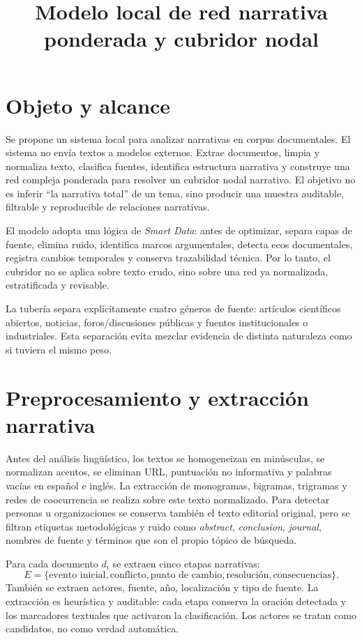 \documentclass[11pt]{article}
\title{Modelo local de red narrativa ponderada y cubridor nodal}
\author{}
\date{}
\begin{document}
\maketitle

\section{Objeto y alcance}

Se propone un sistema local para analizar narrativas en corpus documentales.
El sistema no envía textos a modelos externos. Extrae documentos, limpia y
normaliza texto, clasifica fuentes, identifica estructura narrativa y construye
una red compleja ponderada para resolver un cubridor nodal narrativo. El objetivo
no es inferir ``la narrativa total'' de un tema, sino producir una muestra
auditable, filtrable y reproducible de relaciones narrativas.

El modelo adopta una lógica de \textit{Smart Data}: antes de optimizar, separa
capas de fuente, elimina ruido, identifica marcos argumentales, detecta ecos
documentales, registra cambios temporales y conserva trazabilidad técnica. Por
lo tanto, el cubridor no se aplica sobre texto crudo, sino sobre una red ya
normalizada, estratificada y revisable.

La tubería separa explícitamente cuatro géneros de fuente: artículos
científicos abiertos, noticias, foros/discusiones públicas y fuentes
institucionales o industriales. Esta separación evita mezclar evidencia de
distinta naturaleza como si tuviera el mismo peso.

\section{Preprocesamiento y extracción narrativa}

Antes del análisis lingüístico, los textos se homogeneizan en minúsculas, se
normalizan acentos, se eliminan URL, puntuación no informativa y palabras vacías
en español e inglés. La extracción de monogramas, bigramas, trigramas y redes de
coocurrencia se realiza sobre este texto normalizado. Para detectar personas u
organizaciones se conserva también el texto editorial original, pero se filtran
etiquetas metodológicas y ruido como \textit{abstract}, \textit{conclusion},
\textit{journal}, nombres de fuente y términos que son el propio tópico de
búsqueda.

Para cada documento $d_i$ se extraen cinco etapas narrativas:
\[
E=\{\text{evento inicial},\text{conflicto},\text{punto de cambio},
\text{resolución},\text{consecuencias}\}.
\]
También se extraen actores, fuente, año, localización y tipo de fuente. La
extracción es heurística y auditable: cada etapa conserva la oración detectada y
los marcadores textuales que activaron la clasificación. Los actores se tratan
como candidatos, no como verdad automática.
\end{document}
